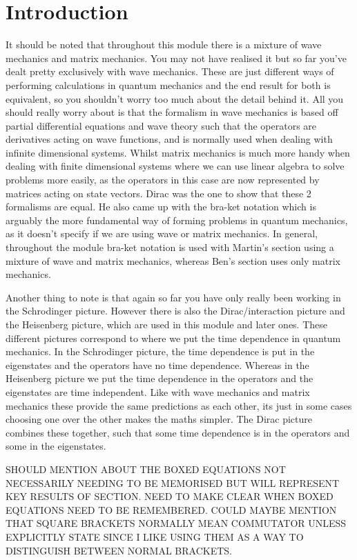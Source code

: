 \documentclass[
10pt, %
oneside, %
english, %
onehalfspacing, %
]{McMasterThesis} %
\begin{document}
\section*{\Huge Introduction} 
It should be noted that throughout this module there is a mixture of wave mechanics and matrix mechanics. You may not have realised it but so far you've dealt pretty exclusively with wave mechanics. These are just different ways of performing calculations in quantum mechanics and the end result for both is equivalent, so you shouldn't worry too much about the detail behind it. All you should really worry about is that the formalism in wave mechanics is based off partial differential equations and wave theory such that the operators are derivatives acting on wave functions, and is normally used when dealing with infinite dimensional systems. Whilst matrix mechanics is much more handy when dealing with finite dimensional systems where we can use linear algebra to solve problems more easily, as the operators in this case are now represented by matrices acting on state vectors. Dirac was the one to show that these 2 formalisms are equal. He also came up with the bra-ket notation which is arguably the more fundamental way of forming problems in quantum mechanics, as it doesn't specify if we are using wave or matrix mechanics. In general, throughout the module bra-ket notation is used with Martin's section using a mixture of wave and matrix mechanics, whereas Ben's section uses only matrix mechanics.

\noindent Another thing to note is that again so far you have only really been working in the Schrodinger picture. However there is also the Dirac/interaction picture and the Heisenberg picture, which are used in this module and later ones. These different pictures correspond to where we put the time dependence in quantum mechanics. In the Schrodinger picture, the time dependence is put in the eigenstates and the operators have no time dependence. Whereas in the Heisenberg picture we put the time dependence in the operators and the eigenstates are time independent. Like with wave mechanics and matrix mechanics these provide the same predictions as each other, its just in some cases choosing one over the other makes the maths simpler. The Dirac picture combines these together, such that some time dependence is in the operators and some in the eigenstates.

SHOULD MENTION ABOUT THE BOXED EQUATIONS NOT NECESSARILY NEEDING TO BE MEMORISED BUT WILL REPRESENT KEY RESULTS OF SECTION. NEED TO MAKE CLEAR WHEN BOXED EQUATIONS NEED TO BE REMEMBERED. COULD MAYBE MENTION THAT SQUARE BRACKETS NORMALLY MEAN COMMUTATOR UNLESS EXPLICITLY STATE SINCE I LIKE USING THEM AS A WAY TO DISTINGUISH BETWEEN NORMAL BRACKETS.
\end{document}
